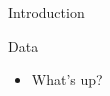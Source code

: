 \documentclass[final, 14pt]{beamer}
\newlength{\onecolwid}
\begin{document}
\begin{frame}[t]
\begin{columns}[t]
\begin{column}{\onecolwid}
\begin{block}{Introduction}
\end{block}


\begin{block}{Data}

\begin{itemize}

  \item What's up?

\end{itemize}

\begin{figure}
  \centering
	\inc
\end{figure}
\end{block}
\end{column}
\end{columns}
\end{frame}
\end{document}
